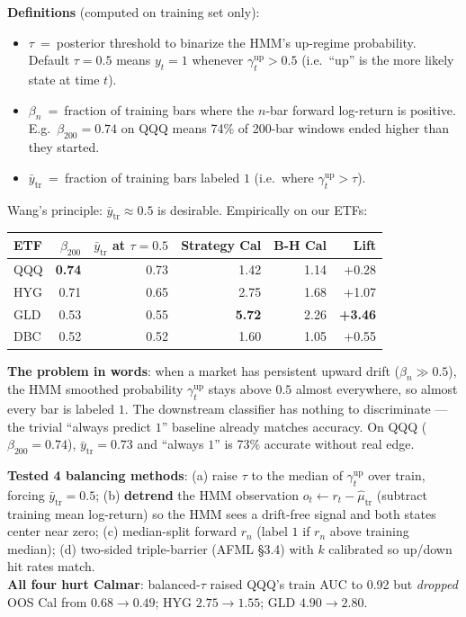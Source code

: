\documentclass[11pt]{article}
\begin{document}
\textbf{Definitions} (computed on training set only):

\begin{itemize}
\item $\tau$ \,=\, posterior threshold to binarize the HMM's up-regime probability. Default $\tau = 0.5$ means $y_t = 1$ whenever $\gamma_t^{\mathrm{up}} > 0.5$ (i.e.\ ``up'' is the more likely state at time $t$).
\item $\beta_n$ \,=\, fraction of training bars where the $n$-bar forward log-return is positive. E.g.\ $\beta_{200} = 0.74$ on QQQ means 74\% of 200-bar windows ended higher than they started.
\item $\bar y_{\mathrm{tr}}$ \,=\, fraction of training bars labeled $1$ (i.e.\ where $\gamma_t^{\mathrm{up}} > \tau$).
\end{itemize}

Wang's principle: $\bar y_{\mathrm{tr}} \approx 0.5$ is desirable. Empirically on our ETFs:

\smallskip
\begin{tabular}{@{}lrrrrr@{}}
\toprule
\textbf{ETF} & $\beta_{200}$ & $\bar y_{\mathrm{tr}}$ at $\tau{=}0.5$ & \textbf{Strategy Cal} & \textbf{B-H Cal} & \textbf{Lift} \\
\midrule
QQQ & \textbf{0.74} & 0.73 & 1.42 & 1.14 & +0.28 \\
HYG & 0.71 & 0.65 & 2.75 & 1.68 & +1.07 \\
GLD & 0.53 & 0.55 & \textbf{5.72} & 2.26 & \textbf{+3.46} \\
DBC & 0.52 & 0.52 & 1.60 & 1.05 & +0.55 \\
\bottomrule
\end{tabular}

\textbf{The problem in words}: when a market has persistent upward drift ($\beta_n \gg 0.5$), the HMM smoothed probability $\gamma_t^{\mathrm{up}}$ stays above $0.5$ almost everywhere, so almost every bar is labeled $1$. The downstream classifier has nothing to discriminate --- the trivial ``always predict $1$'' baseline already matches accuracy. On QQQ ($\beta_{200} = 0.74$), $\bar y_{\mathrm{tr}} = 0.73$ and ``always $1$'' is 73\% accurate without real edge.

\textbf{Tested 4 balancing methods}:\enspace
(a) raise $\tau$ to the median of $\gamma_t^{\mathrm{up}}$ over train, forcing $\bar y_{\mathrm{tr}} = 0.5$;\enspace
(b) \textbf{detrend} the HMM observation $o_t \leftarrow r_t - \hat\mu_{\mathrm{tr}}$ (subtract training mean log-return) so the HMM sees a drift-free signal and both states center near zero;\enspace
(c) median-split forward $r_n$ (label $1$ if $r_n$ above training median);\enspace
(d) two-sided triple-barrier (AFML \S 3.4) with $k$ calibrated so up/down hit rates match.\\
\textbf{All four hurt Calmar}: balanced-$\tau$ raised QQQ's train AUC to 0.92 but \emph{dropped} OOS Cal from $0.68 \to 0.49$; HYG $2.75 \to 1.55$; GLD $4.90 \to 2.80$.
\end{document}

